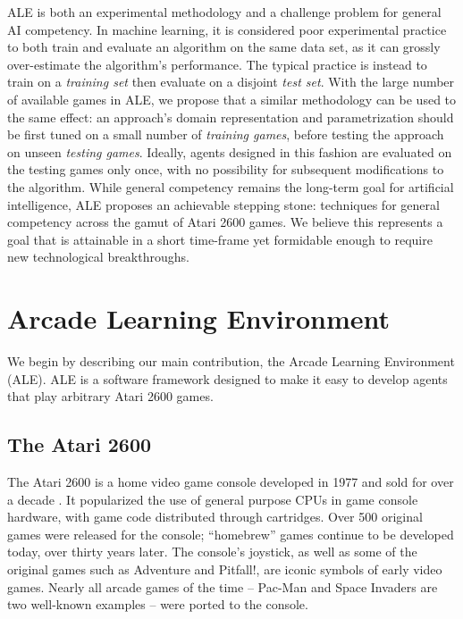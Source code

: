 \documentclass[twoside,11pt]{article}
\newcommand{\gamename}[1]{{\sc #1}}
\begin{document}
ALE is both an experimental methodology and a challenge problem for general AI competency. 
In machine learning, it is considered poor experimental practice to both train and evaluate an algorithm on the same data set, as it can grossly over-estimate the algorithm's performance.  The typical practice is instead to train on a {\em training set} then evaluate on a disjoint {\em test set}.
With the large number of available games in ALE, we propose that a similar methodology can be used to the same effect: an approach's domain representation and parametrization should be first tuned on a small number of {\em training games}, before testing the approach on unseen {\em testing games}. Ideally, agents designed in this fashion are evaluated on the testing games only once, with no possibility for subsequent modifications to the algorithm. 
While general competency remains the long-term goal for artificial intelligence, ALE proposes an achievable stepping stone: techniques for general competency across the gamut of Atari 2600 games.  We believe this represents a goal that is attainable in a short time-frame yet formidable enough to require new technological breakthroughs.

\section{Arcade Learning Environment}
\label{sec:atari}

We begin by describing our main contribution, the Arcade Learning Environment (ALE).  ALE is a software framework designed to make it easy to develop agents that play arbitrary Atari 2600 games.

\subsection{The Atari 2600} 

The Atari 2600 is a home video game console developed in 1977 and sold for over a decade \cite{MontfortBogost2009}.  It popularized the use of general purpose CPUs in game console hardware, with game code distributed through cartridges.  Over 500 original games were released for the console; ``homebrew'' games continue to be developed today, over thirty years later. The console's joystick, as well as some of the original games such as \gamename{Adventure} and \gamename{Pitfall!}, are iconic symbols of early video games.  Nearly all arcade games of the time -- \gamename{Pac-Man} and \gamename{Space Invaders} are two well-known examples -- were ported to the console.
\end{document}
